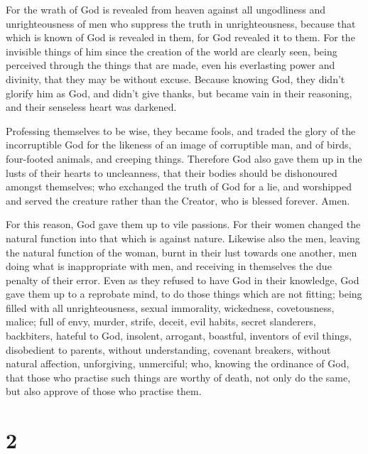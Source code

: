  For the wrath of God is revealed from heaven against all
ungodliness and unrighteousness of men who suppress the truth in
unrighteousness,  because that which is known of God is
revealed in them, for God revealed it to them.  For the
invisible things of him since the creation of the world are clearly
seen, being perceived through the things that are made, even his
everlasting power and divinity, that they may be without excuse.
 Because knowing God, they didn't glorify him as God, and
didn't give thanks, but became vain in their reasoning, and their
senseless heart was darkened.

 Professing themselves to be wise, they became fools,
 and traded the glory of the incorruptible God for the
likeness of an image of corruptible man, and of birds, four-footed
animals, and creeping things.  Therefore God also gave
them up in the lusts of their hearts to uncleanness, that their bodies
should be dishonoured amongst themselves;  who exchanged
the truth of God for a lie, and worshipped and served the creature
rather than the Creator, who is blessed forever. Amen.

 For this reason, God gave them up to vile passions. For
their women changed the natural function into that which is against
nature.  Likewise also the men, leaving the natural
function of the woman, burnt in their lust towards one another, men
doing what is inappropriate with men, and receiving in themselves the
due penalty of their error.  Even as they refused to have
God in their knowledge, God gave them up to a reprobate mind, to do
those things which are not fitting;  being filled with
all unrighteousness, sexual immorality, wickedness, covetousness,
malice; full of envy, murder, strife, deceit, evil habits, secret
slanderers,  backbiters, hateful to God, insolent,
arrogant, boastful, inventors of evil things, disobedient to parents,
 without understanding, covenant breakers, without
natural affection, unforgiving, unmerciful;  who, knowing
the ordinance of God, that those who practise such things are worthy of
death, not only do the same, but also approve of those who practise
them.

\hypertarget{section-1}{%
\section{2}\label{section-1}}


